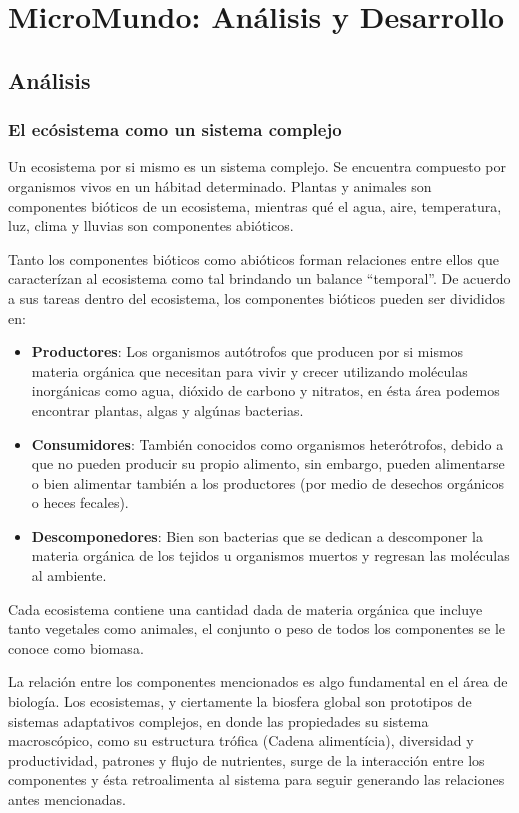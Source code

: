 \chapter{MicroMundo: Análisis y Desarrollo}
  \section{Análisis}
    \subsection{El ecósistema como un sistema complejo}
      Un ecosistema por si mismo es un sistema complejo. Se encuentra compuesto por organismos vivos en un hábitad determinado. Plantas y animales son componentes bióticos de un ecosistema, mientras qué el agua, aire, temperatura, luz, clima y lluvias son componentes abióticos.

      Tanto los componentes bióticos como abióticos forman relaciones entre ellos que caracterízan al ecosistema como tal brindando un balance ``temporal''. De acuerdo a sus tareas dentro del ecosistema, los componentes bióticos pueden ser divididos en:

      \begin{itemize}
        \item \textbf{Productores}: Los organismos autótrofos que producen por si mismos materia orgánica que necesitan para vivir y crecer utilizando moléculas inorgánicas como agua, dióxido de carbono y nitratos, en ésta área podemos encontrar plantas, algas y algúnas bacterias.
        \item \textbf{Consumidores}: También conocidos como organismos heterótrofos, debido a que no pueden producir su propio alimento, sin embargo, pueden alimentarse o bien alimentar también a los productores (por medio de desechos orgánicos o heces fecales).
        \item \textbf{Descomponedores}: Bien son bacterias que se dedican a descomponer la materia orgánica de los tejidos u organismos muertos y regresan las moléculas al ambiente.
      \end{itemize}     

      Cada ecosistema contiene una cantidad dada de materia orgánica que incluye tanto vegetales como animales, el conjunto o peso de todos los componentes se le conoce como biomasa.\cite{6}

      La relación entre los componentes mencionados es algo fundamental en el área de biología. Los ecosistemas, y ciertamente la biosfera global son prototipos de sistemas adaptativos complejos, en donde las propiedades su sistema macroscópico, como su estructura trófica (Cadena alimentícia), diversidad y productividad, patrones y flujo de nutrientes, surge de la interacción entre los componentes y ésta retroalimenta al sistema para seguir generando las relaciones antes mencionadas.      

